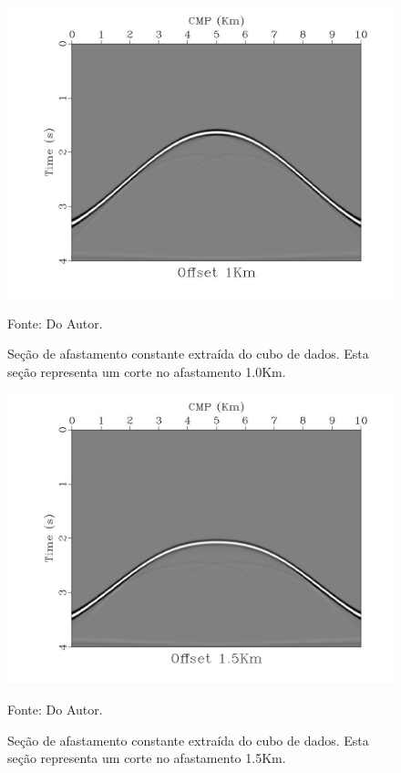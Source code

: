 \begin{figure}[htb]
\caption{Seção de afastamento constante extraída do cubo de dados. Esta seção representa um corte no
afastamento 1.0Km.}
\begin{center}
\includegraphics[scale=0.3]{images/off-80.jpeg}
\vspace{-0.3cm}
\end{center}
\begin{center}
 Fonte: Do Autor.
\end{center}
\label{fig:5.4}
\end{figure}

\begin{figure}[htb]
\caption{Seção de afastamento constante extraída do cubo de dados. Esta seção representa um corte no
afastamento 1.5Km.}
\begin{center}
\includegraphics[scale=0.3]{images/off-120.jpeg}
\vspace{-0.3cm}
\end{center}
\begin{center}
 Fonte: Do Autor.
\end{center}
\label{fig:5.5}
\end{figure}



